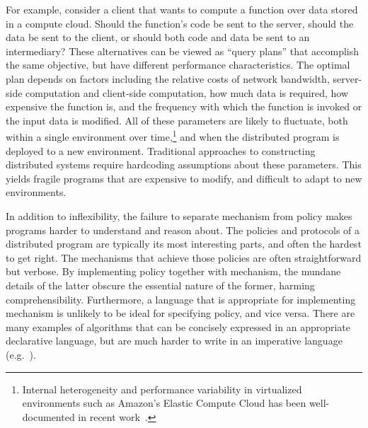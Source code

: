 \documentclass{article}
\begin{document}
For example, consider a client that wants to compute a function over
data stored in a compute cloud. Should the function's code be sent to
the server, should the data be sent to the client, or should both code
and data be sent to an intermediary? These alternatives can be viewed
as ``query plans'' that accomplish the same objective, but have
different performance characteristics. The optimal plan depends on
factors including the relative costs of network bandwidth, server-side
computation and client-side computation, how much data is required,
how expensive the function is, and the frequency with which the
function is invoked or the input data is modified. All of these
parameters are likely to fluctuate, both within a single environment
over time,\footnote{Internal heterogeneity and performance variability
  in virtualized environments such as Amazon's Elastic Compute Cloud
  has been well-documented in recent work~\cite{late-sched}.} and when
the distributed program is deployed to a new environment. Traditional
approaches to constructing distributed systems require hardcoding
assumptions about these parameters. This yields fragile programs that
are expensive to modify, and difficult to adapt to new environments.

In addition to inflexibility, the failure to separate mechanism from
policy makes programs harder to understand and reason about. The
policies and protocols of a distributed program are typically its most
interesting parts, and often the hardest to get right. The mechanisms
that achieve those policies are often straightforward but verbose. By
implementing policy together with mechanism, the mundane details of
the latter obscure the essential nature of the former, harming
comprehensibility. Furthermore, a language that is appropriate for
implementing mechanism is unlikely to be ideal for specifying policy,
and vice versa. There are many examples of algorithms that can be
concisely expressed in an appropriate declarative language, but are
much harder to write in an imperative language (e.g.\
\cite{chord-overlog}).
\end{document}
